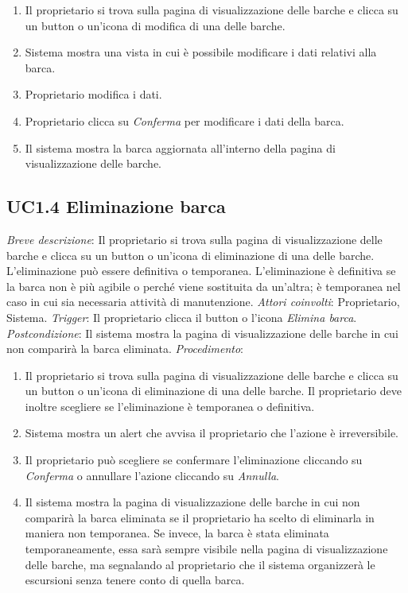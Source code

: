 \begin{enumerate}
    \item Il proprietario si trova sulla pagina di visualizzazione delle barche e clicca su un button o un'icona di modifica di una delle barche.
    \item Sistema mostra una vista in cui è possibile modificare i dati relativi alla barca.
    \item Proprietario modifica i dati.
    \item Proprietario clicca su \textit{Conferma} per modificare i dati della barca.
    \item Il sistema mostra la barca aggiornata all'interno della pagina di visualizzazione delle barche.
\end{enumerate}

\subsection{UC1.4 Eliminazione barca}

\noindent \emph{Breve descrizione}: Il proprietario si trova sulla pagina di visualizzazione delle barche e clicca su un button o un'icona di eliminazione di una delle barche.
L'eliminazione può essere definitiva o temporanea. L'eliminazione è definitiva se la barca non è più agibile o perché viene sostituita da un'altra;
è temporanea nel caso in cui sia necessaria attività di manutenzione.\medbreak
\noindent \emph{Attori coinvolti}: Proprietario, Sistema.\medbreak
\noindent \emph{Trigger}: Il proprietario clicca il button o l'icona \textit{Elimina barca}.\medbreak
\noindent \emph{Postcondizione}: Il sistema mostra la pagina di visualizzazione delle barche in cui non comparirà la barca eliminata.\medbreak
\noindent \emph{Procedimento}:

\begin{enumerate}
    \item Il proprietario si trova sulla pagina di visualizzazione delle barche e clicca su un button o un'icona di eliminazione di una delle barche. Il proprietario deve inoltre
          scegliere se l'eliminazione è temporanea o definitiva.
    \item Sistema mostra un alert che avvisa il proprietario che l'azione è irreversibile.
    \item Il proprietario può scegliere se confermare l'eliminazione cliccando su \textit{Conferma} o annullare l'azione cliccando su \textit{Annulla}.
    \item Il sistema mostra la pagina di visualizzazione delle barche in cui non comparirà la barca eliminata se il proprietario ha scelto di eliminarla in maniera non temporanea.
          Se invece, la barca è stata eliminata temporaneamente, essa sarà sempre visibile nella pagina di visualizzazione delle barche, ma segnalando al proprietario che il sistema organizzerà
          le escursioni senza tenere conto di quella barca.
\end{enumerate}


